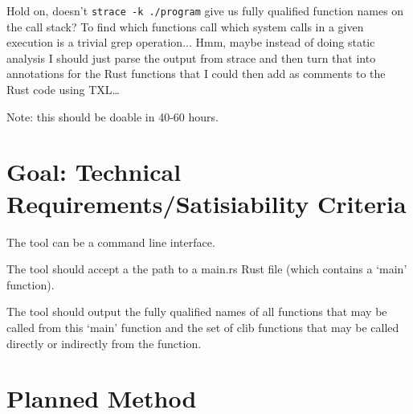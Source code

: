 \documentclass[11pt]{article}
\begin{document}
Hold on, doesn't \lstinline{strace -k ./program} give us fully qualified function names on the call stack?
To find which functions call which system calls in a given execution is a trivial grep operation...
Hmm, maybe instead of doing static analysis I should just parse the output from strace and then turn that into annotations for the Rust functions that I could then add as comments to the Rust code using TXL\dots

Note: this should be doable in 40-60 hours.

\section{Goal: Technical Requirements/Satisiability Criteria}

The tool can be a command line interface.

The tool should accept a the path to a main.rs Rust file (which contains a `main' function).

The tool should output the fully qualified names of all functions that may be called from this `main' function and the set of clib functions that may be called directly or indirectly from the function.

\section{Planned Method}
\end{document}

